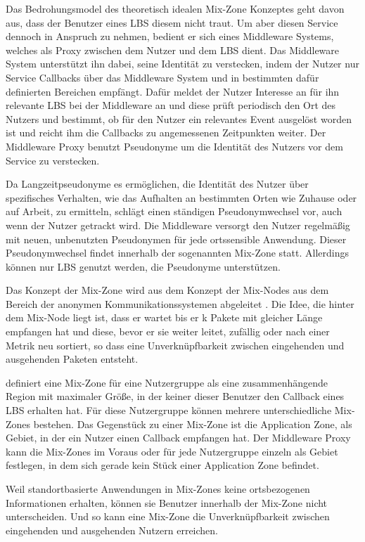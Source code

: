 Das Bedrohungsmodel des theoretisch idealen Mix-Zone Konzeptes \cite{Beresford2003} geht davon aus, dass der Benutzer eines LBS diesem nicht traut. Um aber diesen Service dennoch in Anspruch zu nehmen,  bedient er sich eines Middleware Systems, welches als Proxy zwischen dem Nutzer und dem LBS dient. Das Middleware System unterstützt ihn dabei, seine Identität zu verstecken, indem der Nutzer nur Service Callbacks über das Middleware System und in bestimmten dafür definierten Bereichen empfängt. Dafür meldet der Nutzer Interesse an für ihn relevante LBS bei der Middleware an und diese prüft periodisch den Ort des Nutzers und bestimmt, ob für den Nutzer ein relevantes Event ausgelöst worden ist und reicht ihm die Callbacks zu angemessenen Zeitpunkten weiter. Der Middleware Proxy benutzt Pseudonyme um die Identität des Nutzers vor dem Service zu verstecken.

Da Langzeitpseudonyme es ermöglichen, die Identität des Nutzer über spezifisches Verhalten, wie das Aufhalten an bestimmten Orten wie Zuhause oder auf Arbeit, zu ermitteln, schlägt \cite{Beresford2003} einen ständigen Pseudonymwechsel vor, auch wenn der Nutzer getrackt wird. Die Middleware versorgt den Nutzer regelmäßig mit neuen, unbenutzten Pseudonymen für jede ortssensible Anwendung. Dieser Pseudonymwechsel findet innerhalb der sogenannten Mix-Zone statt. Allerdings können nur LBS genutzt werden, die Pseudonyme unterstützen.

Das Konzept der Mix-Zone wird aus dem Konzept der Mix-Nodes aus dem Bereich der anonymen Kommunikationssystemen abgeleitet \cite{Chow2011}. Die Idee, die hinter dem Mix-Node liegt ist, dass er wartet bis er k Pakete mit gleicher Länge empfangen hat und diese, bevor er sie weiter leitet, zufällig oder nach einer Metrik neu sortiert, so dass eine Unverknüpfbarkeit zwischen eingehenden und ausgehenden Paketen  entsteht.

\cite{Beresford2003} definiert eine Mix-Zone für eine Nutzergruppe als eine zusammenhängende Region mit maximaler Größe, in der keiner dieser Benutzer den Callback eines LBS erhalten hat. Für diese Nutzergruppe können mehrere unterschiedliche Mix-Zones bestehen. Das Gegenstück zu einer Mix-Zone ist die Application Zone, als Gebiet, in der ein Nutzer einen Callback empfangen hat. Der Middleware Proxy kann die Mix-Zones im Voraus oder für jede Nutzergruppe einzeln als Gebiet festlegen, in dem sich gerade kein Stück einer Application Zone befindet.

Weil standortbasierte Anwendungen in Mix-Zones keine ortsbezogenen Informationen erhalten, können sie Benutzer innerhalb der Mix-Zone nicht unterscheiden. Und so kann eine Mix-Zone die Unverknüpfbarkeit zwischen eingehenden und ausgehenden Nutzern erreichen.


